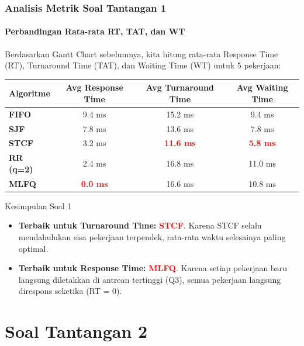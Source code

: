\documentclass[t,aspectratio=169,xcolor=dvipsnames]{beamer}
\newcommand{\tem}[1]{\textbf{\textcolor{red}{#1}}}
\begin{document}
\begin{frame}
    \frametitle{Analisis Metrik Soal Tantangan 1}
    \framesubtitle{Perbandingan Rata-rata RT, TAT, dan WT}
    \scriptsize
    Berdasarkan Gantt Chart sebelumnya, kita hitung rata-rata Response Time (RT), Turnaround Time (TAT), dan Waiting Time (WT) untuk 5 pekerjaan:
    \vspace{0.2cm}
    \begin{table}[]
        \centering
        \begin{tabular}{lccc}
            \toprule
            \textbf{Algoritme} & \textbf{Avg Response Time} & \textbf{Avg Turnaround Time} & \textbf{Avg Waiting Time} \\
            \midrule
            \textbf{FIFO} & 9.4 ms & 15.2 ms & 9.4 ms \\
            \textbf{SJF} & 7.8 ms & 13.6 ms & 7.8 ms \\
            \textbf{STCF} & 3.2 ms & \tem{11.6 ms} & \tem{5.8 ms} \\
            \textbf{RR (q=2)} & 2.4 ms & 16.8 ms & 11.0 ms \\
            \textbf{MLFQ} & \tem{0.0 ms} & 16.6 ms & 10.8 ms \\
            \bottomrule
        \end{tabular}
    \end{table}
    \vspace{0.2cm}
    \begin{alertblock}{Kesimpulan Soal 1}
        \begin{itemize}
            \item \textbf{Terbaik untuk Turnaround Time:} \tem{STCF}. Karena STCF selalu mendahulukan sisa pekerjaan terpendek, rata-rata waktu selesainya paling optimal.
            \item \textbf{Terbaik untuk Response Time:} \tem{MLFQ}. Karena setiap pekerjaan baru langsung diletakkan di antrean tertinggi (Q3), semua pekerjaan langsung direspons seketika (RT = 0).
        \end{itemize}
    \end{alertblock}
\end{frame}

\section{Soal Tantangan 2}
\end{document}
